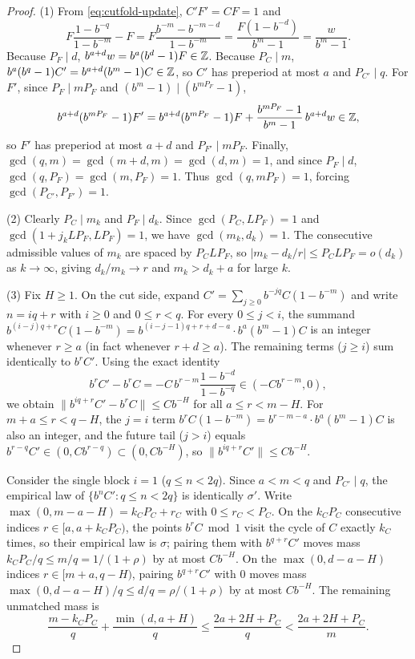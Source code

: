 \documentclass[11pt]{article}
\newcommand{\dist}[1]{\lVert #1\rVert}
\begin{document}
\begin{proof}
(1) From \eqref{eq:cutfold-update}, $C'F'=CF=1$ and
\[
F\frac{1-b^{-q}}{1-b^{-m}}-F=F\frac{b^{-m}-b^{-m-d}}{1-b^{-m}}=\frac{F(1-b^{-d})}{b^m-1}=\frac{w}{b^m-1}.
\]
Because $P_F\mid d$, $b^{a+d}w=b^a(b^d-1)F\in\mathbb Z$. Because $P_C\mid m$, $b^a(b^q-1)C'=b^{a+d}(b^m-1)C\in\mathbb Z$, so $C'$ has preperiod at most $a$ and $P_{C'}\mid q$. For $F'$, since $P_F\mid mP_F$ and $(b^m-1)\mid(b^{mP_F}-1)$,
\[
b^{a+d}(b^{mP_F}-1)F'=b^{a+d}(b^{mP_F}-1)F+\frac{b^{mP_F}-1}{b^m-1}\,b^{a+d}w\in\mathbb Z,
\]
so $F'$ has preperiod at most $a+d$ and $P_{F'}\mid mP_F$. Finally, $\gcd(q,m)=\gcd(m+d,m)=\gcd(d,m)=1$, and since $P_F\mid d$, $\gcd(q,P_F)=\gcd(m,P_F)=1$. Thus $\gcd(q,mP_F)=1$, forcing $\gcd(P_{C'},P_{F'})=1$.

(2) Clearly $P_C\mid m_k$ and $P_F\mid d_k$. Since $\gcd(P_C,LP_F)=1$ and $\gcd(1+j_kLP_F,LP_F)=1$, we have $\gcd(m_k,d_k)=1$. The consecutive admissible values of $m_k$ are spaced by $P_CLP_F$, so $|m_k-d_k/r|\le P_CLP_F=o(d_k)$ as $k\to\infty$, giving $d_k/m_k\to r$ and $m_k>d_k+a$ for large $k$.

(3) Fix $H\ge1$. On the cut side, expand $C'=\sum_{j\ge0}b^{-jq}C(1-b^{-m})$ and write $n=iq+r$ with $i\ge0$ and $0\le r<q$. For every $0\le j<i$, the summand $b^{(i-j)q+r}C(1-b^{-m})=b^{(i-j-1)q+r+d-a}\cdot b^a(b^m-1)C$ is an integer whenever $r\ge a$ (in fact whenever $r+d\ge a$). The remaining terms ($j\ge i$) sum identically to $b^rC'$. Using the exact identity
\[
b^rC'-b^rC=-C\,b^{r-m}\frac{1-b^{-d}}{1-b^{-q}}\in(-Cb^{r-m},0),
\]
we obtain $\dist{b^{iq+r}C'-b^rC}\le Cb^{-H}$ for all $a\le r<m-H$. For $m+a\le r<q-H$, the $j=i$ term $b^rC(1-b^{-m})=b^{r-m-a}\cdot b^a(b^m-1)C$ is also an integer, and the future tail ($j>i$) equals $b^{r-q}C'\in(0,Cb^{r-q})\subset(0,Cb^{-H})$, so $\dist{b^{iq+r}C'}\le Cb^{-H}$.

Consider the single block $i=1$ ($q\le n<2q$). Since $a<m<q$ and $P_{C'}\mid q$, the empirical law of $\{b^nC':q\le n<2q\}$ is identically $\sigma'$. Write $\max(0,m-a-H)=k_CP_C+r_C$ with $0\le r_C<P_C$. On the $k_CP_C$ consecutive indices $r\in[a,a+k_CP_C)$, the points $b^rC\bmod1$ visit the cycle of $C$ exactly $k_C$ times, so their empirical law is $\sigma$; pairing them with $b^{q+r}C'$ moves mass $k_CP_C/q\le m/q=1/(1+\rho)$ by at most $Cb^{-H}$. On the $\max(0,d-a-H)$ indices $r\in[m+a,q-H)$, pairing $b^{q+r}C'$ with $0$ moves mass $\max(0,d-a-H)/q\le d/q=\rho/(1+\rho)$ by at most $Cb^{-H}$. The remaining unmatched mass is
\[
\frac{m-k_CP_C}{q}+\frac{\min(d,a+H)}{q}\le\frac{2a+2H+P_C}{q}<\frac{2a+2H+P_C}{m}.
\]


\end{proof}
\end{document}
